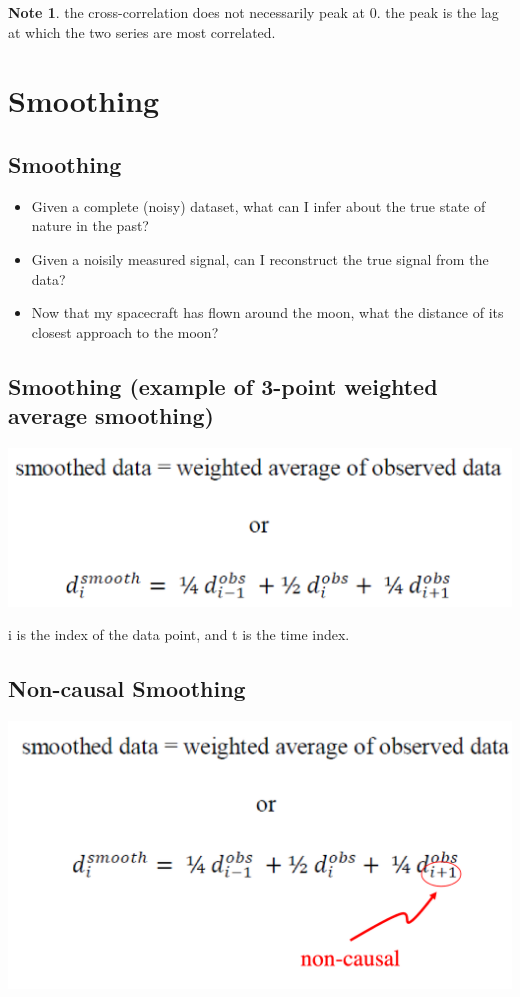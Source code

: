 \documentclass[11pt]{article}
\theoremstyle{definition}
\newtheorem{note}{Note}
\begin{document}
\begin{note}
  the cross-correlation does not necessarily peak at 0. the peak is the lag at which the two series are most correlated.
\end{note}

\section{Smoothing}
\subsection{Smoothing}
\begin{itemize}
  \item Given a complete (noisy) dataset, what can I infer about the
  true state of nature in the past?
  \item Given a noisily measured signal, can I reconstruct the true
  signal from the data?
  \item Now that my spacecraft has flown around the moon, what the
  distance of its closest approach to the moon?
\end{itemize}

\subsection{Smoothing
(example of 3-point weighted average smoothing)}
\includegraphics[width = \textwidth/2]{14.png}

i is the index of the data point, and t is the time index.

\subsection{Non-causal Smoothing}
\includegraphics[width = \textwidth/2]{15.png}
\end{document}
